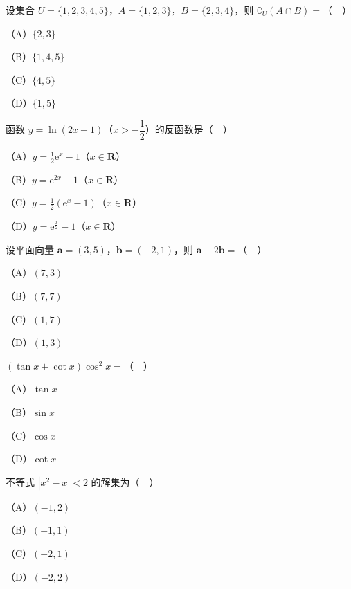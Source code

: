 


\begin{question}
设集合 $U=\{1,2,3,4,5\}$，$A=\{1,2,3\}$，$B=\{2,3,4\}$，则 $\complement_U(A\cap B)=$（　）

（A）$\{2,3\}$

（B）$\{1,4,5\}$

（C）$\{4,5\}$

（D）$\{1,5\}$

\end{question}
\begin{question}
函数 $y=\ln(2x+1)$（$x>-\dfrac12$）的反函数是（　）

（A）$y=\frac12\mathrm e^x-1$（$x\in\mathbf R$）

（B）$y=\mathrm e^{2x}-1$（$x\in\mathbf R$）

（C）$y=\frac12(\mathrm e^x-1)$（$x\in\mathbf R$）

（D）$y=\mathrm e^{\frac x2}-1$（$x\in\mathbf R$）

\end{question}
\begin{question}
设平面向量 $\boldsymbol a=(3,5)$，$\boldsymbol b=(-2,1)$，则 $\boldsymbol a-2\boldsymbol b=$（　）

（A）$(7,3)$

（B）$(7,7)$

（C）$(1,7)$

（D）$(1,3)$

\end{question}
\begin{question}
$(\tan x+\cot x)\cos^2x=$（　）

（A）$\tan x$

（B）$\sin x$

（C）$\cos x$

（D）$\cot x$

\end{question}
\begin{question}
不等式 $|x^2-x|<2$ 的解集为（　）

（A）$(-1,2)$

（B）$(-1,1)$

（C）$(-2,1)$

（D）$(-2,2)$

\end{question}
